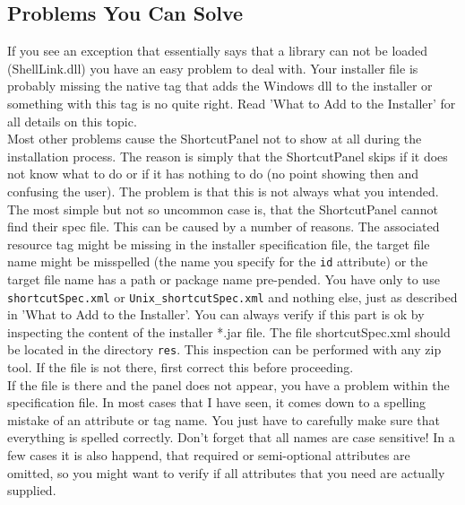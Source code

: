 \subsection{Problems You Can Solve}

If you see an exception that essentially says that a library can not be
loaded (ShellLink.dll) you have an easy problem to deal with. Your
installer file is probably missing the native tag that adds the Windows
dll to the installer or something with this tag is no quite right. Read
'What to Add to the Installer' for all details on this topic.\\

Most other problems cause the ShortcutPanel not to show at all during
the installation process. The reason is simply that the ShortcutPanel
skips if it does not know what to do or if it has nothing to do (no
point showing then and confusing the user). The problem is that this is
not always what you intended. The most simple but not so uncommon
case is, that the ShortcutPanel cannot find their spec file. This can be caused by
a number of reasons. The associated resource tag might be missing in the
installer specification file, the target file name might be misspelled (the
name you specify for the \texttt{id} attribute) or the target file name
has a path or package name pre-pended. You have only to use
\texttt{shortcutSpec.xml} or \texttt{Unix\_shortcutSpec.xml} and nothing else,
just as described in 'What to Add to the Installer'.
You can always verify if this part is ok by
inspecting the content of the installer *.jar file. The file
shortcutSpec.xml should be located in the directory \texttt{res}. This
inspection can be performed with any zip tool. If the file is not there,
first correct this before proceeding.\\

If the file is there and the panel does not appear, you have a problem
within the specification file. In most cases that I have seen, it comes
down to a spelling mistake of an attribute or tag name. You just have to
carefully make sure that everything is spelled correctly. Don't forget
that all names are case sensitive! In a few cases it is also happend,
that required or semi-optional attributes are omitted, so you might want
to verify if all attributes that you need are actually supplied.\\

